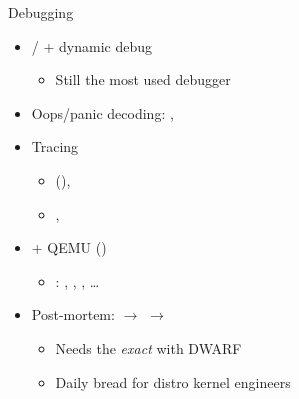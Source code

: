 \begin{frame}{Debugging}

  \begin{itemize}[<+->]
    \item {} /  + dynamic debug
      \begin{itemize}[<.->]
	\item Still the most used debugger
      \end{itemize}
    \item Oops/panic decoding: ,
    \item Tracing
      \begin{itemize}[<.->]
	\item {} (), 
	\item {}, 
      \end{itemize}
    \item {} + QEMU ()
      \begin{itemize}[<.->]
	\item {}: , , , \dots
      \end{itemize}
    \item Post-mortem:  $\rightarrow$  $\rightarrow$ 
      \begin{itemize}[<.->]
	\item Needs the \emph{exact}  with DWARF
	\item Daily bread for distro kernel engineers
      \end{itemize}
  \end{itemize}

\end{frame}

